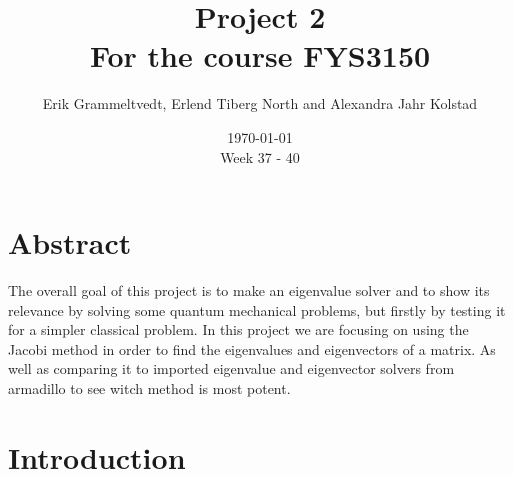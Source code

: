 \documentclass{article}
\begin{document}
\addtocounter{page}{0}

\title{Project 2 \\
      \large For the course FYS3150}
\date{\today \\
    \vspace{1mm}
    \large Week 37 - 40}

\author{Erik Grammeltvedt, Erlend Tiberg North and Alexandra Jahr Kolstad}

\maketitle


\vspace{1cm}

\tableofcontents

\vspace{1cm}


\newpage
\clearpage

\vspace{2cm}

\vspace{1cm}

\section{Abstract} \label{sec:Abstract}

The overall goal of this project is to make an eigenvalue solver and to show its relevance by solving some quantum mechanical problems, but firstly by testing it for a simpler classical problem. In this project we are focusing on using the Jacobi method in order to find the eigenvalues and eigenvectors of a matrix.  As well as comparing it to imported eigenvalue and eigenvector solvers from armadillo to see witch method is most potent.


\vspace{1cm}

\section{Introduction} \label{sec:Introduction}
\end{document}

